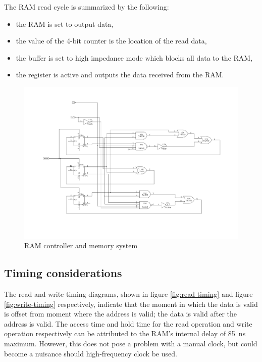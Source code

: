 \documentclass[11pt]{article}
\begin{document}
The RAM read cycle is summarized by the following:

\begin{itemize}
 
 	 \item the RAM is set to output data,
	 \item the value of the 4-bit counter is the location of the read data,
 	 \item the buffer is set to high impedance mode which blocks all data to the RAM,
	 \item the register is active and outputs the data received from the RAM.
	  
\end{itemize}

\begin{figure}[htpb]
	\centering
	\includegraphics[scale=0.5]{controller}
	\caption{RAM controller and memory system}
	\label{fig:controller}
\end{figure}

\subsection{Timing considerations}

The read and write timing diagrams, shown in figure \ref{fig:read-timing} and figure \ref{fig:write-timing} respectively, indicate that the moment in which the data is valid is offset from moment where the address is valid; the data is valid after the address is valid. The access time and hold time for the read operation and write operation respectively can be attributed to the RAM's internal delay of \SI{85}{\nano\second} maximum. However, this does not pose a problem with a manual clock, but could become a nuisance should high-frequency clock be used.
\end{document}
